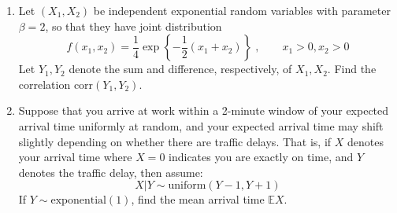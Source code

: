 \documentclass[
  letterpaper,
  DIV=11,
  numbers=noendperiod]{scrartcl}
\begin{document}
\begin{enumerate}
\def\labelenumi{\arabic{enumi}.}
\setcounter{enumi}{4}
\item
  Let \((X_1, X_2)\) be independent exponential random variables with
  parameter \(\beta = 2\), so that they have joint distribution
  \[f(x_1, x_2) = \frac{1}{4} \exp\left\{-\frac{1}{2}(x_1 + x_2)\right\}\;,\qquad x_1 > 0, x_2 > 0\]
  Let \(Y_1, Y_2\) denote the sum and difference, respectively, of
  \(X_1, X_2\). Find the correlation \(\text{corr}(Y_1, Y_2)\).
\item
  Suppose that you arrive at work within a 2-minute window of your
  expected arrival time uniformly at random, and your expected arrival
  time may shift slightly depending on whether there are traffic delays.
  That is, if \(X\) denotes your arrival time where \(X = 0\) indicates
  you are exactly on time, and \(Y\) denotes the traffic delay, then
  assume: \[
  X|Y \sim \text{uniform}(Y - 1, Y + 1)
  \] If \(Y \sim \text{exponential}(1)\), find the mean arrival time
  \(\mathbb{E}X\).
\end{enumerate}
\end{document}
